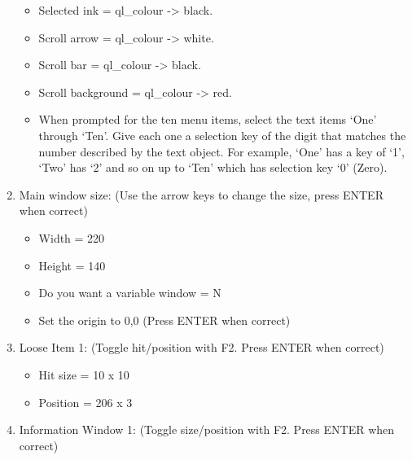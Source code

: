 \begin{enumerate}
{\begin{itemize}[itemsep=0pt]
\begin{itemize}[itemsep=0pt]
\item{}Selected ink = ql\_colour -{}>{} black.


\item{}Scroll arrow = ql\_colour -{}>{} white.


\item{}Scroll bar = ql\_colour -{}>{} black.


\item{}Scroll background = ql\_colour -{}>{} red.


\item{}When prompted for the ten menu items, select the text
                  items `One' through `Ten'. Give each one a selection key of
                  the digit that matches the number described by the text
                  object. For example, `One' has a key of `1', `Two' has `2'
                  and so on up to `Ten' which has selection key `0'
                  (Zero).

\end{itemize}


\end{itemize}
}
\item{Main window size: (Use the arrow keys to change the size, press
        ENTER when correct)
\begin{itemize}[itemsep=0pt]

\item{}Width = 220


\item{}Height = 140


\item{}Do you want a variable window = N


\item{}Set the origin to 0,0 (Press ENTER when correct)

\end{itemize}
}
\item{Loose Item 1: (Toggle hit/position with F2. Press ENTER when
        correct)
\begin{itemize}[itemsep=0pt]

\item{}Hit size = 10 x 10


\item{}Position = 206 x 3

\end{itemize}
}
\item{Information Window 1: (Toggle size/position with F2. Press ENTER
        when correct)
\begin{itemize}[itemsep=0pt]


\end{itemize}}
\end{enumerate}
